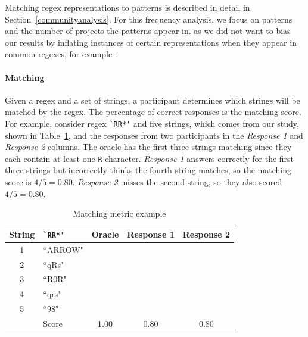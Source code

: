 Matching regex representations to patterns is described in detail in Section~\ref{communityanalysis}.
For this frequency analysis, we focus on patterns and the number of projects the patterns appear in.
as we did not want to bias our results by inflating instances of certain representations when they appear in common regexes, for example .





\paragraph{Matching}
 Given a regex and a set of strings, a participant determines which strings will be matched by the regex. The percentage of correct responses is the matching score. For example, consider regex \verb!`RR*'! and five strings, which comes from our study, shown in Table~\ref{matchingmetric}, and the responses from two participants in the \emph{Response 1} and \emph{Response 2} columns. The oracle has the first three strings matching since they each contain at least one \verb!R! character. \emph{Response 1} answers correctly for the first three strings but incorrectly thinks the fourth string matches, so the matching score is $4/5 = 0.80$. \emph{Response 2} misses the second string, so they also scored $4/5 = 0.80$.


\begin{table}
\caption{Matching metric example \label{matchingmetric}}
\begin{center}
\begin{small}
\begin{tabular} {cl | c c c}
\textbf{String} & \verb!`RR*'! & \textbf{Oracle} & \textbf{Response 1} & \textbf{Response 2} \\ \hline
1 & ``ARROW" 	& \checkmark	& \checkmark	& \checkmark\\
2 & ``qRs" 		& \checkmark	& \checkmark	&\\
3 & ``R0R" 		& \checkmark 	& \checkmark 	& \checkmark\\
4 & ``qrs"		& 			& \checkmark 	&\\
5 & ``98"  		& 			&			&\\ \hline
& Score 		& 1.00		& 0.80		& 0.80 \\
\end{tabular}
\end{small}
\end{center}
\end{table}

